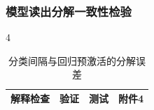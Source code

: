 \hypertarget{q3-ux6a21ux578bux8bfbux51faux5206ux89e3ux4e00ux81f4ux6027ux68c0ux9a8c}{%
\subsubsection{模型读出分解一致性检验}\label{q3-ux6a21ux578bux8bfbux51faux5206ux89e3ux4e00ux81f4ux6027ux68c0ux9a8c}}

\begin{PaperTable}{4}

\begin{table}[!htbp]
\centering\caption{分类间隔与回归预激活的分解误差\label{q3-tab13}}
\begin{tabular}{@{}llll@{}}
\toprule
\begin{minipage}[b]{\dimexpr 0.430000\linewidth-2.580000\tabcolsep\relax}\raggedright
解释检查\strut
\end{minipage} & \begin{minipage}[b]{\dimexpr 0.190000\linewidth-1.140000\tabcolsep\relax}\raggedleft
验证\strut
\end{minipage} & \begin{minipage}[b]{\dimexpr 0.190000\linewidth-1.140000\tabcolsep\relax}\raggedleft
测试\strut
\end{minipage} & \begin{minipage}[b]{\dimexpr 0.190000\linewidth-1.140000\tabcolsep\relax}\raggedleft
附件4\strut
\end{minipage}\tabularnewline
\midrule


\end{tabular}
\end{table}
\end{PaperTable}
